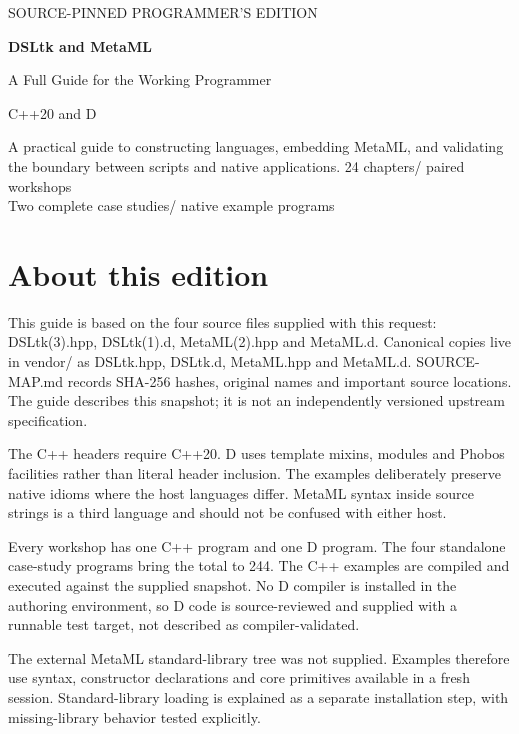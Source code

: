 \thispagestyle{empty}
\vspace*{12mm}
{\color{accent}\sffamily\large SOURCE-PINNED PROGRAMMER'S EDITION\par}
\vspace{12mm}
{\sffamily\bfseries\fontsize{31}{35}\selectfont DSLtk and MetaML\par}
\vspace{8mm}
{\sffamily\fontsize{21}{26}\selectfont A Full Guide for the Working Programmer\par}
\vspace{15mm}
{\Large C++20 and D\par}
\vspace{6mm}
A practical guide to constructing languages, embedding MetaML, and validating the boundary between scripts and native applications.
\vfill
24 chapters\quad / paired workshops\\[4mm]
Two complete case studies\quad / native example programs
\vspace{10mm}
\clearpage
\section*{About this edition}
This guide is based on the four source files supplied with this request: DSLtk(3).hpp, DSLtk(1).d, MetaML(2).hpp and MetaML.d. Canonical copies live in vendor/ as DSLtk.hpp, DSLtk.d, MetaML.hpp and MetaML.d. SOURCE-MAP.md records SHA-256 hashes, original names and important source locations. The guide describes this snapshot; it is not an independently versioned upstream specification.

The C++ headers require C++20. D uses template mixins, modules and Phobos facilities rather than literal header inclusion. The examples deliberately preserve native idioms where the host languages differ. MetaML syntax inside source strings is a third language and should not be confused with either host.

Every workshop has one C++ program and one D program. The four standalone case-study programs bring the total to 244. The C++ examples are compiled and executed against the supplied snapshot. No D compiler is installed in the authoring environment, so D code is source-reviewed and supplied with a runnable test target, not described as compiler-validated.

The external MetaML standard-library tree was not supplied. Examples therefore use syntax, constructor declarations and core primitives available in a fresh session. Standard-library loading is explained as a separate installation step, with missing-library behavior tested explicitly.

